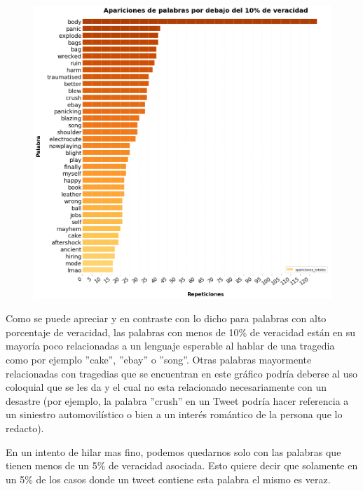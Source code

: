 \documentclass[titlepage,a4paper]{article}
\begin{document}
    
    \begin{figure}[H]
    \centering
    \includegraphics[width=1\textwidth]{graficos/Analisis Lexico Grafico/apariciones_de_palabras_por_debajo_de_10_de_veracidad.png}
    \caption{} 
    \end{figure}
    Como se puede apreciar y en contraste con lo dicho  para palabras con alto porcentaje de veracidad, las palabras con menos de 10\% de veracidad están en su mayoría poco relacionadas a un lenguaje esperable al hablar de una tragedia como por ejemplo ''cake'', ''ebay'' o ''song''. Otras palabras mayormente relacionadas con tragedias que se encuentran en este gráfico podría deberse al uso coloquial que se les da y el cual no esta relacionado necesariamente con un desastre (por ejemplo, la palabra ''crush'' en un Tweet podría hacer referencia a un siniestro automovilístico o bien a un interés romántico de la persona que lo redacto).
    

    En un intento de hilar mas fino, podemos quedarnos solo con las palabras que tienen menos de un 5\% de veracidad asociada. Esto quiere decir que solamente en un  5\% de los casos donde un tweet contiene esta palabra el mismo es veraz. 
    
\end{document}
